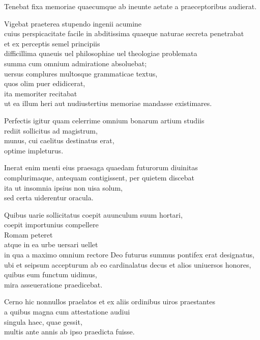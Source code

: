 \documentclass[a5paper,twoside]{article}
\begin{document}
Tenebat fixa memoriae quaecumque ab ineunte aetate a praeceptoribus audierat. 

Vigebat praeterea stupendo ingenii acumine \\
cuius perspicacitate facile in abditissima quaeque naturae secreta penetrabat \\
et ex perceptis semel principiis \\
difficillima quaeuis uel philosophiae uel theologiae problemata \\
summa cum omnium admiratione absoluebat; \\
uersus complures multosque grammaticae textus, \\
quos olim puer edidicerat, \\
ita memoriter recitabat \\
ut ea illum heri aut nudiustertius memoriae mandasse existimares. 

Perfectis igitur quam celerrime omnium bonarum artium studiis \\
rediit sollicitus ad magistrum, \\
munus, cui caelitus destinatus erat, \\
optime impleturus.  

Inerat enim menti eius praesaga quaedam futurorum diuinitas \\
complurimaque, antequam contigissent, per quietem discebat \\
ita ut insomnia ipsius non uisa solum, \\
sed certa uiderentur oracula. 

Quibus uarie sollicitatus coepit auunculum suum hortari, \\
coepit importunius compellere \\
Romam peteret \\
atque in ea urbe uersari uellet \\
in qua a maximo omnium rectore Deo futurus summus pontifex erat designatus, \\
ubi et seipsum accepturum ab eo cardinalatus decus et alios uniuersos honores, \\
quibus eum functum uidimus, \\
mira asseueratione praedicebat. 

Cerno hic nonnullos praelatos et ex aliis ordinibus uiros praestantes \\
a quibus magna cum attestatione audiui \\
singula haec, quae gessit, \\
multis ante annis ab ipso praedicta fuisse.  
\end{document}
